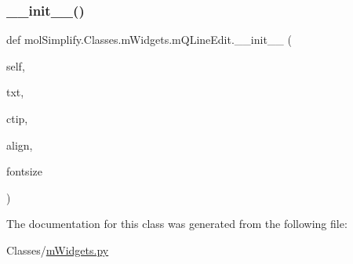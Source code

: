 \subsubsection{\texorpdfstring{\+\_\+\+\_\+init\+\_\+\+\_\+()}{\_\_init\_\_()}}
{\footnotesize\ttfamily def mol\+Simplify.\+Classes.\+m\+Widgets.\+m\+Q\+Line\+Edit.\+\_\+\+\_\+init\+\_\+\+\_\+ (\begin{DoxyParamCaption}\item[{}]{self,  }\item[{}]{txt,  }\item[{}]{ctip,  }\item[{}]{align,  }\item[{}]{fontsize }\end{DoxyParamCaption})}



The documentation for this class was generated from the following file\+:\begin{DoxyCompactItemize}
\item 
Classes/\hyperlink{mWidgets_8py}{m\+Widgets.\+py}\end{DoxyCompactItemize}
